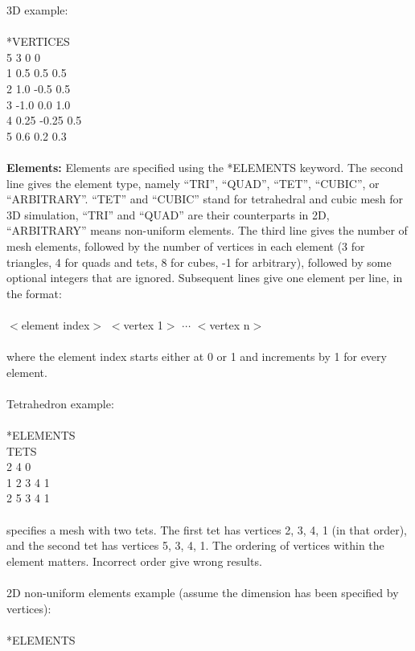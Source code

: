 \documentclass[11pt,fullpage]{article}
\begin{document}
\noindent{}3D example:
\\\\
\noindent{}*VERTICES\\
5 3 0 0\\
1 0.5 0.5 0.5\\
2 1.0 -0.5 0.5\\
3 -1.0 0.0 1.0\\
4 0.25 -0.25 0.5\\
5 0.6 0.2 0.3
\\\\
\noindent{}\textbf{Elements:} Elements are specified using the
*ELEMENTS keyword. The second line gives the element type, namely
``TRI'', ``QUAD'', ``TET'', ``CUBIC'', or ``ARBITRARY''. ``TET'' and ``CUBIC'' stand
for tetrahedral and cubic mesh for 3D simulation, ``TRI'' and ``QUAD''
are their counterparts in 2D, ``ARBITRARY'' means non-uniform elements. The third line gives the
number of mesh elements, followed by the number of vertices in each
element (3 for triangles, 4 for quads and tets, 8 for cubes, -1 for arbitrary), followed
by some optional integers that are ignored. Subsequent lines give one
element per line, in the format:
\\\\
\noindent{}$<$element index$>$ $<$vertex 1$>$ $\cdots$ $<$vertex n$>$
\\\\
\noindent{}where the element index starts either at 0 or 1 and
increments by 1 for every element. 
\\\\
\noindent{}Tetrahedron example:
\\\\
\noindent{}*ELEMENTS\\
TETS\\
2 4 0\\
1 2 3 4 1\\
2 5 3 4 1
\\\\
\noindent{} specifies a mesh with two tets. The first tet has vertices
2, 3, 4, 1 (in that order), and the second tet has vertices 5, 3, 4,
1. The ordering of vertices within the element matters. Incorrect
order give wrong results.
\\\\
\noindent{}2D non-uniform elements example (assume the dimension has
been specified by vertices):
\\\\
\noindent{}*ELEMENTS\\
\end{document}
